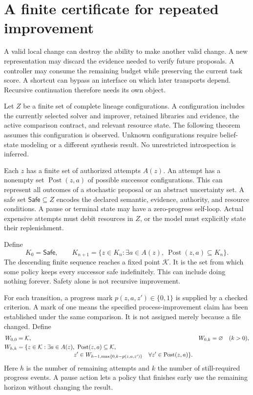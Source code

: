 \documentclass[11pt,letterpaper]{article}
\theoremstyle{plain}
\theoremstyle{definition}
\newcommand{\Safe}{\mathsf{Safe}}\newcommand{\Post}{\operatorname{Post}}\newcommand{\Pareto}{\operatorname{Pareto}}
\begin{document}
\section{A finite certificate for repeated improvement}\label{sec:recursion}
A valid local change can destroy the ability to make another valid change. A new representation may discard the evidence needed to verify future proposals. A controller may consume the remaining budget while preserving the current task score. A shortcut can bypass an interface on which later transports depend. Recursive continuation therefore needs its own object.

Let $Z$ be a finite set of complete lineage configurations. A configuration includes the currently selected solver and improver, retained libraries and evidence, the active comparison contract, and relevant resource state. The following theorem assumes this configuration is observed. Unknown configurations require belief-state modeling or a different synthesis result. No unrestricted introspection is inferred.

Each $z$ has a finite set of authorized attempts $A(z)$. An attempt has a nonempty set $\Post(z,a)$ of possible successor configurations. This can represent all outcomes of a stochastic proposal or an abstract uncertainty set. A safe set $\Safe\subseteq Z$ encodes the declared semantic, evidence, authority, and resource conditions. A pause or terminal state may have a zero-progress self-loop. Actual expensive attempts must debit resources in $Z$, or the model must explicitly state their replenishment.

Define
\[
K_0=\Safe,\qquad
K_{n+1}=\{z\in K_n:\exists a\in A(z),\ \Post(z,a)\subseteq K_n\}.
\]
The descending finite sequence reaches a fixed point $\mathcal K$. It is the set from which some policy keeps every successor safe indefinitely. This can include doing nothing forever. Safety alone is not recursive improvement.

For each transition, a progress mark $p(z,a,z')\in\{0,1\}$ is supplied by a checked criterion. A mark of one means the specified process-improvement claim has been established under the same comparison. It is not assigned merely because a file changed. Define
\begin{align}\label{eq:progress}
W_{0,0}&=\mathcal K, & W_{0,k}&=\varnothing\quad(k>0),\\
W_{h,k}&=\{z\in\mathcal K:\exists a\in A(z),\ \Post(z,a)\subseteq\mathcal K,\nonumber\\[-2pt]
&\hspace{34mm} z'\in W_{h-1,\max\{0,k-p(z,a,z')\}}
\quad\forall z'\in\Post(z,a)\}.\nonumber
\end{align}
Here $h$ is the number of remaining attempts and $k$ the number of still-required progress events. A pause action lets a policy that finishes early use the remaining horizon without changing the result.
\end{document}
